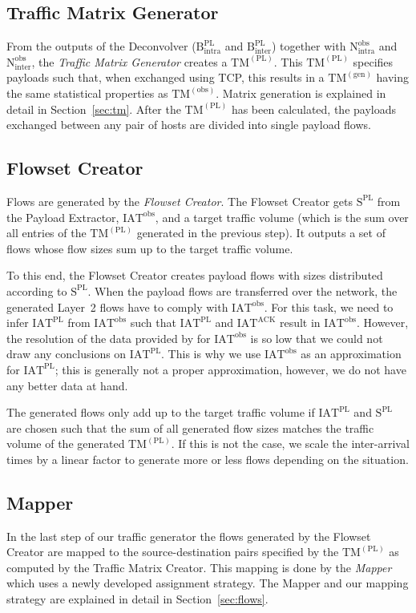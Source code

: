 \documentclass[journal,10pt]{IEEEtran}
\newcommand{\lt}{Layer~2}
\newcommand{\obstm}{\ensuremath{\mathrm{TM}^{(\mathrm{obs})}}}
\newcommand{\gentm}{\ensuremath{\mathrm{TM}^{(\mathrm{gen})}}}
\newcommand{\pltm}{\ensuremath{\mathrm{TM}^{(\mathrm{PL})}}}
\newcommand{\bytes}[2]{\ensuremath{\mathrm{B}^{\mathrm{#1}}_{\mathrm{#2}}}}
\newcommand{\partners}[2]{\ensuremath{\mathrm{N}^{\mathrm{#1}}_{\mathrm{#2}}}}
\newcommand{\iat}[1] {\ensuremath{\mathrm{IAT}^{\mathrm{#1}}}}
\newcommand{\size}[1]{\ensuremath{\mathrm{S}  ^{\mathrm{#1}}}}
\begin{document}
\subsection{Traffic Matrix Generator}
From the outputs of the Deconvolver (\bytes{PL}{intra} and \bytes{PL}{inter}) together with \partners{obs}{intra} and \partners{obs}{inter},
the \emph{Traffic Matrix Generator} creates a \pltm{}.
This \pltm{} specifies payloads such that, when exchanged using TCP, this results in a \gentm{}
having the same statistical properties as \obstm{}.
Matrix generation is explained in detail in Section~\ref{sec:tm}.
After the \pltm{} has been calculated, the payloads exchanged between any pair of hosts are divided into single payload flows.

\subsection{Flowset Creator}
Flows are generated by the \emph{Flowset Creator}.
The Flowset Creator gets \size{PL} from the Payload Extractor, \iat{obs}, and 
a target traffic volume (which is the sum over all entries of the \pltm{} generated in the previous step). 
It outputs a set of flows whose flow sizes sum up to the target traffic volume.


To this end, the Flowset Creator creates payload flows with sizes distributed according to \size{PL}.
When the payload flows are transferred over the network, the generated \lt{} flows have to comply with \iat{obs}.
For this task, we need to infer \iat{PL} from \iat{obs} such that \iat{PL} and \iat{ACK} result in \iat{obs}.
However, the resolution of the data provided by \cite{MSR-datacenters} for \iat{obs} is so low that we could not
draw any conclusions on \iat{PL}. This is why we use \iat{obs} as an approximation for \iat{PL}; this is generally not a 
proper approximation, however, we do not have any better data at hand.

The generated flows only add up to the target traffic volume if \iat{PL} and \size{PL}
are chosen such that the sum of all generated flow sizes matches the traffic volume of the generated \pltm{}.
If this is not the case, we scale the inter-arrival times by a linear factor to generate more or less flows depending on the situation.




\subsection{Mapper}
In the last step of our traffic generator the flows generated by the Flowset Creator are mapped to the source-destination pairs specified by the
\pltm{} as computed by the Traffic Matrix Creator. 
This mapping is done by the \emph{Mapper} which uses a newly developed assignment strategy. The Mapper 
and our mapping strategy are explained in detail in Section~\ref{sec:flows}.
\end{document}
